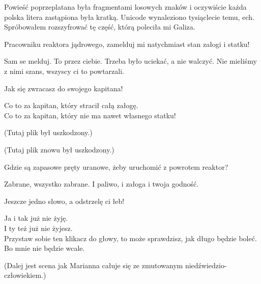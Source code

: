 Powieść poprzeplatana była fragmentami losowych znaków i oczywiście każda polska litera zastąpiona była kratką. Unicode wynaleziono tysiąclecie temu, ech.
Spróbowałem rozszyfrować tę część, którą poleciła mi Galiza.

\begin{poem}
	
	\charkap{}
	Pracowniku reaktora jądrowego, zamelduj mi natychmiast stan załogi i statku!
	
	\charkos{}
	Sam se melduj. To przez ciebie. Trzeba było uciekać, a nie walczyć.
	Nie mieliśmy z nimi szans, wszyscy ci to powtarzali.
	
	\charkap{}
	Jak się zwracasz do swojego kapitana!
	
	\charkos{}
	Co to za kapitan, który stracił całą załogę. \\
	Co to za kapitan, który nie ma nawet własnego statku!
\end{poem}
	(Tutaj plik był uszkodzony.)
\begin{poem}
\end{poem}
	(Tutaj plik znowu był uszkodzony.)
\begin{poem}
	Gdzie są zapasowe pręty uranowe, żeby uruchomić z powrotem reaktor?
	
	\charkos{}
	Zabrane, wszystko zabrane.
	I paliwo, i załoga i twoja godność.
	
	\charkap{}
	Jeszcze jedno słowo, a odstrzelę ci łeb!
	
	\charkos{}
	Ja i tak już nie żyję. \\
	I ty też już nie żyjesz. \\
	Przystaw sobie ten klikacz do głowy, to może sprawdzisz, jak długo będzie boleć. \\
	Bo mnie nie będzie wcale.
	
	
	(Dalej jest scena jak Marianna całuje się ze zmutowanym niedźwiedzio-człowiekiem.)
\end{poem}

